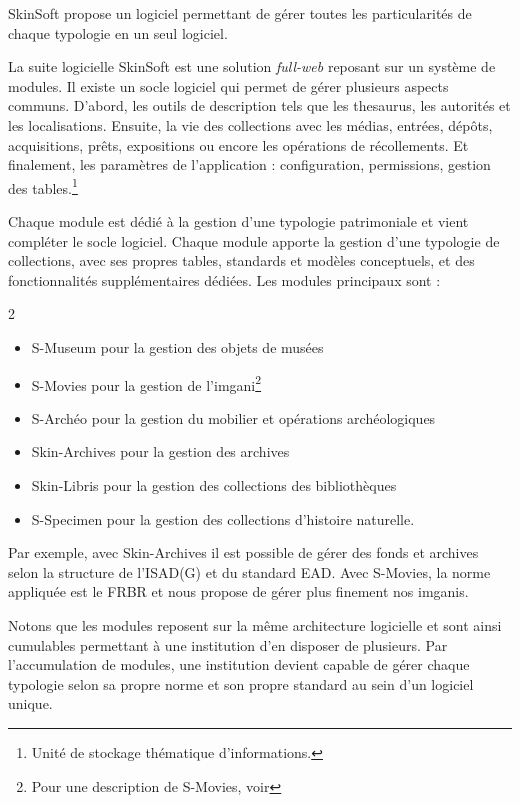 SkinSoft propose un logiciel permettant de gérer toutes les particularités de chaque typologie en un seul logiciel.

La suite logicielle SkinSoft est une solution \textit{full-web} reposant sur un système de modules.\label{module} Il existe un socle logiciel qui permet de gérer plusieurs aspects communs. D'abord, les outils de description tels que les \gls{thesaurus}, les autorités et les localisations. Ensuite, la vie des collections avec les médias, entrées, dépôts, acquisitions, prêts, expositions ou encore les opérations de récollements. Et finalement, les paramètres de l'application : configuration, permissions, gestion des \glspl{table}.\footnote{Unité de stockage thématique d'informations.}

Chaque module est dédié à la gestion d'une typologie patrimoniale et vient compléter le socle logiciel. Chaque module apporte la gestion d'une typologie de collections, avec ses propres \glspl{table}, standards et modèles conceptuels, et des fonctionnalités supplémentaires dédiées. Les modules principaux sont :

\begin{multicols}{2}
	\begin{itemize}
	\item S-Museum pour la gestion des objets de musées 
	\item S-Movies pour la gestion de l'\gls{imgani}\footnote{Pour une description de S-Movies, voir }
	\item S-Archéo pour la gestion du mobilier et opérations archéologiques \item Skin-Archives pour la gestion des archives
	\item Skin-Libris pour la gestion des collections des bibliothèques 
	\item S-Specimen pour la gestion des collections d'histoire naturelle. 
\end{itemize}

\end{multicols}
Par exemple, avec Skin-Archives il est possible de gérer des fonds et archives selon la structure de l'ISAD(G) et du standard EAD. Avec S-Movies, la norme appliquée est le \gls{FRBR} et nous propose de gérer plus finement nos \glspl{imgani}.

Notons que les modules reposent sur la même architecture logicielle et sont ainsi cumulables permettant à une institution d'en disposer de plusieurs. Par l'accumulation de modules, une institution devient capable de gérer chaque typologie selon sa propre norme et son propre standard au sein d'un logiciel unique.


